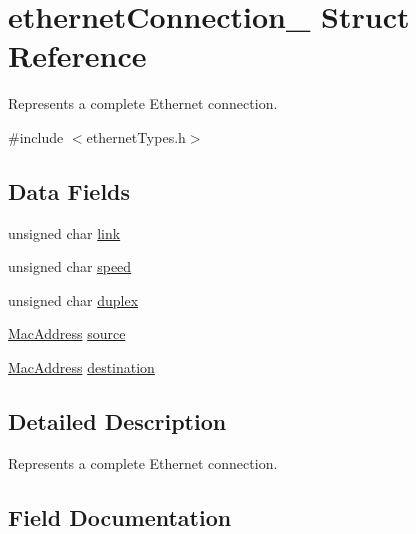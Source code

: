 \hypertarget{structethernet_connection__}{}\section{ethernet\+Connection\+\_\+ Struct Reference}
\label{structethernet_connection__}


Represents a complete Ethernet connection.  




{\ttfamily \#include $<$ethernet\+Types.\+h$>$}

\subsection*{Data Fields}
\begin{DoxyCompactItemize}
\item 
unsigned char \mbox{\hyperlink{structethernet_connection___a1fe5419ef8790482bf98c1ab99a0352e}{link}}
\item 
unsigned char \mbox{\hyperlink{structethernet_connection___aa4eab0a1ec935e4bbdf16be9c7963f3c}{speed}}
\item 
unsigned char \mbox{\hyperlink{structethernet_connection___ab6f2a37edfa559162baa4fbfe00b12c1}{duplex}}
\item 
\mbox{\hyperlink{ethernet_types_8h_a7fed77396097fa92ca5f4b185844244c}{Mac\+Address}} \mbox{\hyperlink{structethernet_connection___ad921b9c440e49b18b551c1c6bda03dcc}{source}}
\item 
\mbox{\hyperlink{ethernet_types_8h_a7fed77396097fa92ca5f4b185844244c}{Mac\+Address}} \mbox{\hyperlink{structethernet_connection___a55c89de46e499edcb53dcccd41f5618a}{destination}}
\end{DoxyCompactItemize}


\subsection{Detailed Description}
Represents a complete Ethernet connection. 

\subsection{Field Documentation}
\mbox{\label{structethernet_connection___a55c89de46e499edcb53dcccd41f5618a}} 
